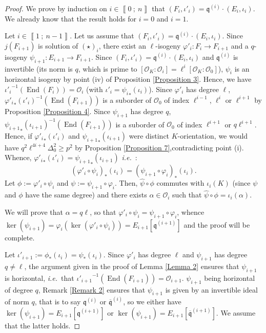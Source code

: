 \documentclass[a4paper,10pt]{report}
\theoremstyle{definition}
\theoremstyle{plain}
\theoremstyle{definition}
\newcommand{\ie}{\emph{i.e.}\ }
\newcommand{\mO}{\mathcal{O}}
\renewcommand{\i}[2]{\left\llbracket #1~;~#2\right\rrbracket}
\renewcommand{\(}{\left(}
\renewcommand{\)}{\right)}
\newcommand{\mf}[1]{\mathfrak{#1}}
\newcommand{\mfq}{\mathfrak{q}}
\DeclareMathOperator{\End}{End}
\begin{document}
\begin{proof}
We prove by induction on $i\in\i{0}{n}$ that $(F_i,\iota'_i)=\mf{q}^{(i)}\cdot(E_{i},\iota_i)$. We already know that the result holds for $i=0$ and $i=1$. 

Let $i\in\i{1}{n-1}$.  Let us assume that $(F_i,\iota'_i)=\mf{q}^{(i)}\cdot(E_{i},\iota_i)$. Since $j(F_{i+1})$ is solution of $(\star)_i$,  there exist an $\ell$-isogeny $\varphi'_i: F_i\longrightarrow F_{i+1}$ and a $q$-isogeny $\psi_{i+1}: E_{i+1}\longrightarrow F_{i+1}$. Since $(F_i,\iota'_i)=\mf{q}^{(i)}\cdot(E_{i},\iota_i)$ and $\mfq^{(i)}$ is invertible (its norm is $q$, which is prime to $[\mO_K:\mO_i]=\ell^i[\mO_K:\mO_0]$), $\psi_i$ is an horizontal isogeny by point (iv) of Proposition \ref{Proposition 3}. Hence, we have ${\iota'_i}^{-1}(\End(F_i))=\mO_i$ (with $\iota'_i={\psi_{i}}_*(\iota_i)$). Since $\varphi'_i$ has degree $\ell$,  ${\varphi'_i}_*(\iota'_i)^{-1}(\End(F_{i+1}))$ is a suborder of $\mO_0$ of index $\ell^{i-1}$, $\ell^i$ or $\ell^{i+1}$ by Proposition \ref{Proposition 4}. Since $\psi_{i+1}$ has degree $q$, ${\psi_{i+1}}_*(\iota_{i+1})^{-1}(\End(F_{i+1}))$ is a suborder of $\mO_0$ of index $\ell^{i+1}$ or $q\ell^{i+1}$. Hence, if ${\varphi'_i}_*(\iota'_i)$ and ${\psi_{i+1}}_*(\iota_{i+1})$ were distinct $K$-orientation, we would have $q^2\ell^{4i+4}\Delta_0^2\geq p^2$ by Proposition \ref{Proposition 7},contradicting point (i). Whence, ${\varphi'_i}_*(\iota'_i)={\psi_{i+1}}_*(\iota_{i+1})$ \ie :
\[(\varphi'_i\circ\psi_i)_*(\iota_i)=(\psi_{i+1}\circ\varphi_i)_*(\iota_i).\]
Let $\phi:=\varphi'_i\circ\psi_i$ and $\psi:=\psi_{i+1}\circ\varphi_i$. Then, $\widehat{\psi}\circ\phi$ commutes with $\iota_i(K)$ (since $\psi$ and $\phi$ have the same degree) and there exists $\alpha\in\mO_i$ such that $\widehat{\psi}\circ\phi=\iota_i(\alpha)$. 

We will prove that $\alpha=q\ell$, so that $\varphi'_i\circ\psi_i=\psi_{i+1}\circ\varphi_i$, whence $\ker(\psi_{i+1})=\varphi_i(\ker(\varphi'_i\circ\psi_i))=E_{i+1}[\mfq^{(i+1)}]$ and the proof will be complete.

Let $\iota'_{i+1}:=\phi_*(\iota_i)=\psi_*(\iota_i)$.  Since $\varphi'_i$ has degree $\ell$ and $\psi_{i+1}$ has degree $q\neq \ell$, the argument given in the proof of Lemma \ref{Lemma 2} ensures that $\psi_{i+1}$ is horizontal, \ie that ${\iota'_{i+1}}^{-1}(\End(F_{i+1}))=\mO_{i+1}$.  $\psi_{i+1}$ being horizontal of degree $q$, Remark \ref{Remark 2} ensures that $\psi_{i+1}$ is given by an invertible ideal of norm $q$, that is to say $\mfq^{(i)}$ or $\overline{\mfq}^{(i)}$, so we either have $\ker(\psi_{i+1})=E_{i+1}[\mfq^{(i+1)}]$ or $\ker(\psi_{i+1})=E_{i+1}[\overline{\mfq}^{(i+1)}]$.  We assume that the latter holds.


\end{proof}
\end{document}
